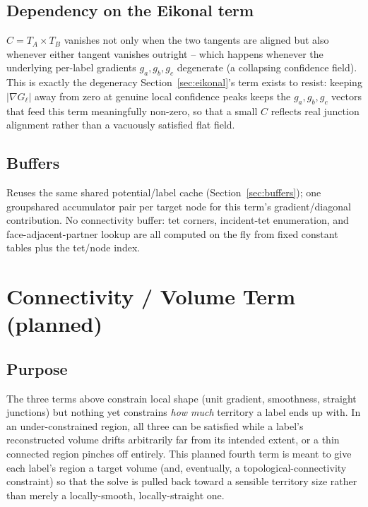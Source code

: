 \documentclass[11pt]{article}
\newcommand{\grad}{\nabla}
\begin{document}
\subsection{Dependency on the Eikonal term}

$C = T_A \times T_B$ vanishes not only when the two tangents are aligned
but also whenever either tangent vanishes outright -- which happens
whenever the underlying per-label gradients $g_a,g_b,g_c$ degenerate (a
collapsing confidence field). This is exactly the degeneracy
Section~\ref{sec:eikonal}'s term exists to resist: keeping $|\grad
G_\ell|$ away from zero at genuine local confidence peaks keeps the $g_a,
g_b,g_c$ vectors that feed this term meaningfully non-zero, so that a
small $C$ reflects real junction alignment rather than a vacuously
satisfied flat field.

\subsection{Buffers}

Reuses the same shared potential/label cache (Section~\ref{sec:buffers});
one groupshared accumulator pair per target node for this term's
gradient/diagonal contribution. No connectivity buffer: tet corners,
incident-tet enumeration, and face-adjacent-partner lookup are all
computed on the fly from fixed constant tables plus the tet/node index.

\section{Connectivity / Volume Term (planned)}
\label{sec:volume}

\subsection{Purpose}

The three terms above constrain local shape (unit gradient, smoothness,
straight junctions) but nothing yet constrains \emph{how much} territory a
label ends up with. In an under-constrained region, all three can be
satisfied while a label's reconstructed volume drifts arbitrarily far from
its intended extent, or a thin connected region pinches off entirely. This
planned fourth term is meant to give each label's region a target
volume (and, eventually, a topological-connectivity constraint) so that
the solve is pulled back toward a sensible territory size rather than
merely a locally-smooth, locally-straight one.
\end{document}
